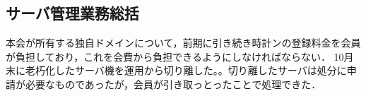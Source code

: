\subsection*{サーバ管理業務総括}

本会が所有する独自ドメインについて，前期に引き続き時計ンの登録料金を会員が負担しており，これを会費から負担できるようにしなければならない．
10月末に老朽化したサーバ機を運用から切り離した。。切り離したサーバは処分に申請が必要なものであったが，会員が引き取っとったことで処理できた．

